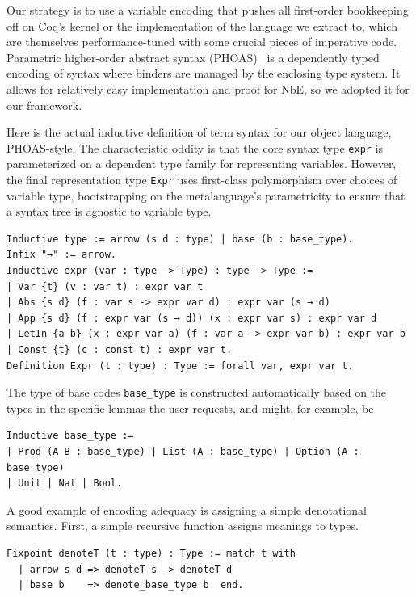 \documentclass[sn-mathphys,pdflatex]{sn-jnl}%
\theoremstyle{thmstyleone}%
\theoremstyle{thmstyletwo}%
\theoremstyle{thmstylethree}%
\begin{document}
Our strategy is to use a variable encoding that pushes all first-order bookkeeping off on Coq's kernel or the implementation of the language we extract to, which are themselves performance-tuned with some crucial pieces of imperative code.
Parametric higher-order abstract syntax (PHOAS)~\cite{PhoasICFP08} is a dependently typed encoding of syntax where binders are managed by the enclosing type system.
It allows for relatively easy implementation and proof for NbE, so we adopted it for our framework.

Here is the actual inductive definition of term syntax for our object language, PHOAS-style.
The characteristic oddity is that the core syntax type \texttt{expr} is parameterized on a dependent type family for representing variables.
However, the final representation type \texttt{Expr} uses first-class polymorphism over choices of variable type, bootstrapping on the metalanguage's parametricity to ensure that a syntax tree is agnostic to variable type.
\begin{verbatim}
Inductive type := arrow (s d : type) | base (b : base_type).
Infix "→" := arrow.
Inductive expr (var : type -> Type) : type -> Type :=
| Var {t} (v : var t) : expr var t
| Abs {s d} (f : var s -> expr var d) : expr var (s → d)
| App {s d} (f : expr var (s → d)) (x : expr var s) : expr var d
| LetIn {a b} (x : expr var a) (f : var a -> expr var b) : expr var b
| Const {t} (c : const t) : expr var t.
Definition Expr (t : type) : Type := forall var, expr var t.
\end{verbatim}

The type of base codes \texttt{base_type} is constructed automatically based on the types in the specific lemmas the user requests, and might, for example, be
\begin{verbatim}
Inductive base_type :=
| Prod (A B : base_type) | List (A : base_type) | Option (A : base_type)
| Unit | Nat | Bool.
\end{verbatim}

A good example of encoding adequacy is assigning a simple denotational semantics.
First, a simple recursive function assigns meanings to types.
\begin{verbatim}
Fixpoint denoteT (t : type) : Type := match t with
  | arrow s d => denoteT s -> denoteT d
  | base b    => denote_base_type b  end.
\end{verbatim}
\end{document}
